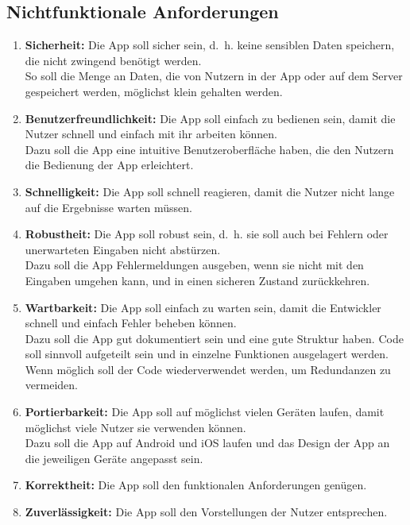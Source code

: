 \subsection{Nichtfunktionale Anforderungen}

\begin{enumerate}
	\item \textbf{Sicherheit:} Die App soll sicher sein, d. h. keine sensiblen Daten speichern, die nicht zwingend benötigt werden.\\
	So soll die Menge an Daten, die von Nutzern in der App oder auf dem Server gespeichert werden, möglichst klein gehalten werden.
	\item \textbf{Benutzerfreundlichkeit:} Die App soll einfach zu bedienen sein, damit die Nutzer schnell und einfach mit ihr arbeiten können.\\
	Dazu soll die App eine intuitive Benutzeroberfläche haben, die den Nutzern die Bedienung der App erleichtert.
	\item \textbf{Schnelligkeit:} Die App soll schnell reagieren, damit die Nutzer nicht lange auf die Ergebnisse warten müssen.
	\item \textbf{Robustheit:} Die App soll robust sein, d. h. sie soll auch bei Fehlern oder unerwarteten Eingaben nicht abstürzen.\\
	Dazu soll die App Fehlermeldungen ausgeben, wenn sie nicht mit den Eingaben umgehen kann, und in einen sicheren Zustand zurückkehren.
	\item \textbf{Wartbarkeit:} Die App soll einfach zu warten sein, damit die Entwickler schnell und einfach Fehler beheben können.\\
	Dazu soll die App gut dokumentiert sein und eine gute Struktur haben.
	Code soll sinnvoll aufgeteilt sein und in einzelne Funktionen ausgelagert werden.
	Wenn möglich soll der Code wiederverwendet werden, um Redundanzen zu vermeiden.
	\item \textbf{Portierbarkeit:} Die App soll auf möglichst vielen Geräten laufen, damit möglichst viele Nutzer sie verwenden können.\\
	Dazu soll die App auf Android und iOS laufen und das Design der App an die jeweiligen Geräte angepasst sein.
	\item \textbf{Korrektheit:} Die App soll den funktionalen Anforderungen genügen.
	\item \textbf{Zuverlässigkeit:} Die App soll den Vorstellungen der Nutzer entsprechen.
\end{enumerate}

